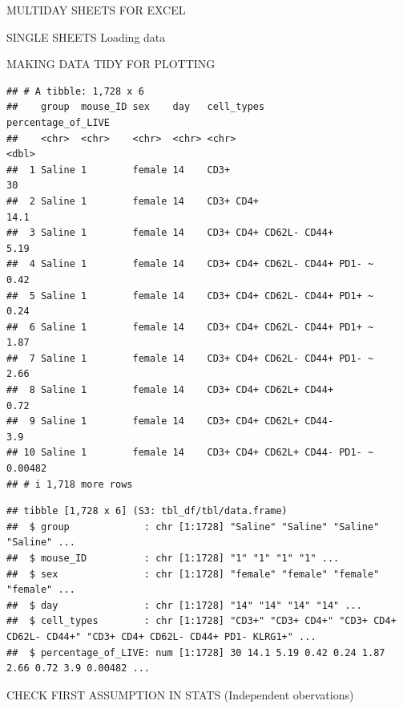 \documentclass[
]{book}
\begin{document}
MULTIDAY SHEETS FOR EXCEL

SINGLE SHEETS Loading data

MAKING DATA TIDY FOR PLOTTING

\begin{verbatim}
## # A tibble: 1,728 x 6
##    group  mouse_ID sex    day   cell_types                    percentage_of_LIVE
##    <chr>  <chr>    <chr>  <chr> <chr>                                      <dbl>
##  1 Saline 1        female 14    CD3+                                    30      
##  2 Saline 1        female 14    CD3+ CD4+                               14.1    
##  3 Saline 1        female 14    CD3+ CD4+ CD62L- CD44+                   5.19   
##  4 Saline 1        female 14    CD3+ CD4+ CD62L- CD44+ PD1- ~            0.42   
##  5 Saline 1        female 14    CD3+ CD4+ CD62L- CD44+ PD1+ ~            0.24   
##  6 Saline 1        female 14    CD3+ CD4+ CD62L- CD44+ PD1+ ~            1.87   
##  7 Saline 1        female 14    CD3+ CD4+ CD62L- CD44+ PD1- ~            2.66   
##  8 Saline 1        female 14    CD3+ CD4+ CD62L+ CD44+                   0.72   
##  9 Saline 1        female 14    CD3+ CD4+ CD62L+ CD44-                   3.9    
## 10 Saline 1        female 14    CD3+ CD4+ CD62L+ CD44- PD1- ~            0.00482
## # i 1,718 more rows
\end{verbatim}

\begin{verbatim}
## tibble [1,728 x 6] (S3: tbl_df/tbl/data.frame)
##  $ group             : chr [1:1728] "Saline" "Saline" "Saline" "Saline" ...
##  $ mouse_ID          : chr [1:1728] "1" "1" "1" "1" ...
##  $ sex               : chr [1:1728] "female" "female" "female" "female" ...
##  $ day               : chr [1:1728] "14" "14" "14" "14" ...
##  $ cell_types        : chr [1:1728] "CD3+" "CD3+ CD4+" "CD3+ CD4+ CD62L- CD44+" "CD3+ CD4+ CD62L- CD44+ PD1- KLRG1+" ...
##  $ percentage_of_LIVE: num [1:1728] 30 14.1 5.19 0.42 0.24 1.87 2.66 0.72 3.9 0.00482 ...
\end{verbatim}

CHECK FIRST ASSUMPTION IN STATS (Independent obervations)
\end{document}
